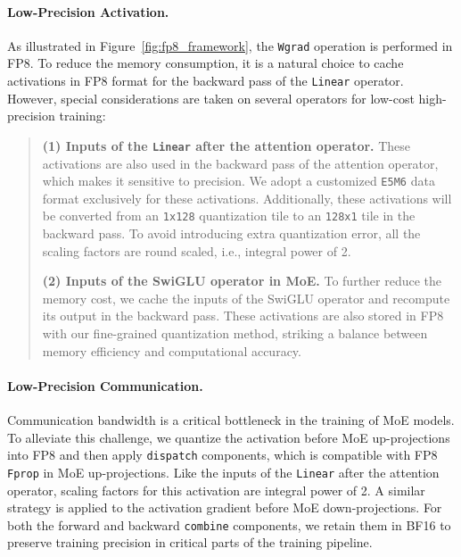 \paragraph{Low-Precision Activation.}
As illustrated in Figure~\ref{fig:fp8_framework}, the \texttt{Wgrad} operation is performed in FP8. 
To reduce the memory consumption, it is a natural choice to cache activations in FP8 format for the backward pass of the \texttt{Linear} operator.
However, special considerations are taken on several operators for low-cost high-precision training:
\begin{quote}
\textbf{(1) Inputs of the \texttt{Linear} after the attention operator.} These activations are also used in the backward pass of the attention operator, which makes it sensitive to precision. We adopt a customized \texttt{E5M6} data format exclusively for these activations. Additionally, these activations will be converted from an \texttt{1x128} quantization tile to an \texttt{128x1} tile in the backward pass. To avoid introducing extra quantization error, all the scaling factors are round scaled, i.e., integral power of 2.

\textbf{(2) Inputs of the SwiGLU operator in MoE.} To further reduce the memory cost, we cache the inputs of the SwiGLU operator and recompute its output in the backward pass. These activations are also stored in FP8 with our fine-grained quantization method, striking a balance between memory efficiency and computational accuracy.
\end{quote}

\paragraph{Low-Precision Communication.}
Communication bandwidth is a critical bottleneck in the training of MoE models. 
To alleviate this challenge, we quantize the activation before MoE up-projections into FP8 and then apply \texttt{dispatch} components, which is compatible with FP8 \texttt{Fprop} in MoE up-projections. Like the inputs of the \texttt{Linear} after the attention operator, scaling factors for this activation are integral power of 2.
A similar strategy is applied to the activation gradient before MoE down-projections. 
For both the forward and backward \texttt{combine} components, we retain them in BF16 to preserve training precision in critical parts of the training pipeline.